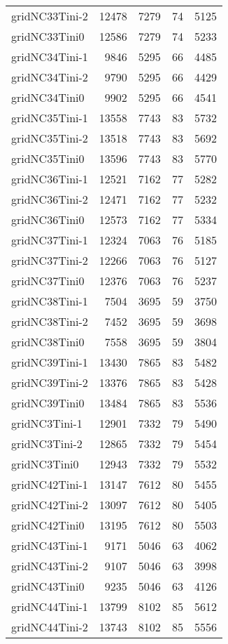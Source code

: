 \begin{longtable}{lrrrr}
gridNC33Tini-2 & 12478 & 7279 & 74 & 5125 \\
gridNC33Tini0 & 12586 & 7279 & 74 & 5233 \\
gridNC34Tini-1 & 9846 & 5295 & 66 & 4485 \\
gridNC34Tini-2 & 9790 & 5295 & 66 & 4429 \\
gridNC34Tini0 & 9902 & 5295 & 66 & 4541 \\
gridNC35Tini-1 & 13558 & 7743 & 83 & 5732 \\
gridNC35Tini-2 & 13518 & 7743 & 83 & 5692 \\
gridNC35Tini0 & 13596 & 7743 & 83 & 5770 \\
gridNC36Tini-1 & 12521 & 7162 & 77 & 5282 \\
gridNC36Tini-2 & 12471 & 7162 & 77 & 5232 \\
gridNC36Tini0 & 12573 & 7162 & 77 & 5334 \\
gridNC37Tini-1 & 12324 & 7063 & 76 & 5185 \\
gridNC37Tini-2 & 12266 & 7063 & 76 & 5127 \\
gridNC37Tini0 & 12376 & 7063 & 76 & 5237 \\
gridNC38Tini-1 & 7504 & 3695 & 59 & 3750 \\
gridNC38Tini-2 & 7452 & 3695 & 59 & 3698 \\
gridNC38Tini0 & 7558 & 3695 & 59 & 3804 \\
gridNC39Tini-1 & 13430 & 7865 & 83 & 5482 \\
gridNC39Tini-2 & 13376 & 7865 & 83 & 5428 \\
gridNC39Tini0 & 13484 & 7865 & 83 & 5536 \\
gridNC3Tini-1 & 12901 & 7332 & 79 & 5490 \\
gridNC3Tini-2 & 12865 & 7332 & 79 & 5454 \\
gridNC3Tini0 & 12943 & 7332 & 79 & 5532 \\
gridNC42Tini-1 & 13147 & 7612 & 80 & 5455 \\
gridNC42Tini-2 & 13097 & 7612 & 80 & 5405 \\
gridNC42Tini0 & 13195 & 7612 & 80 & 5503 \\
gridNC43Tini-1 & 9171 & 5046 & 63 & 4062 \\
gridNC43Tini-2 & 9107 & 5046 & 63 & 3998 \\
gridNC43Tini0 & 9235 & 5046 & 63 & 4126 \\
gridNC44Tini-1 & 13799 & 8102 & 85 & 5612 \\
gridNC44Tini-2 & 13743 & 8102 & 85 & 5556 \\

\end{longtable}
